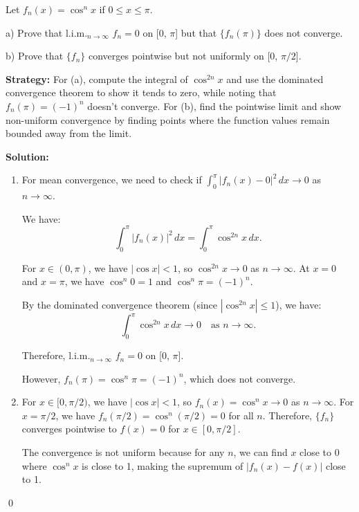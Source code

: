 \begin{problembox}
Let \( f_n(x) = \cos^n x \) if \( 0 \leq x \leq \pi \).

a) Prove that l.i.m.\(_{n\to\infty}\) \( f_n = 0 \) on [0, \(\pi\)] but that \( \{f_n(\pi)\} \) does not converge.

b) Prove that \( \{f_n\} \) converges pointwise but not uniformly on [0, \(\pi/2\)].
\end{problembox}

\noindent\textbf{Strategy:} For (a), compute the integral of \( \cos^{2n} x \) and use the dominated convergence theorem to show it tends to zero, while noting that \( f_n(\pi) = (-1)^n \) doesn't converge. For (b), find the pointwise limit and show non-uniform convergence by finding points where the function values remain bounded away from the limit.

\bigskip\noindent\textbf{Solution:}
\begin{enumerate}[label=(\alph*)]
\item For mean convergence, we need to check if \( \int_0^\pi |f_n(x) - 0|^2 \, dx \to 0 \) as \( n \to \infty \).

We have:
\[\int_0^\pi |f_n(x)|^2 \, dx = \int_0^\pi \cos^{2n} x \, dx.\]

For \( x \in (0, \pi) \), we have \( |\cos x| < 1 \), so \( \cos^{2n} x \to 0 \) as \( n \to \infty \). At \( x = 0 \) and \( x = \pi \), we have \( \cos^n 0 = 1 \) and \( \cos^n \pi = (-1)^n \).

By the dominated convergence theorem (since \( |\cos^{2n} x| \leq 1 \)), we have:
\[\int_0^\pi \cos^{2n} x \, dx \to 0 \quad \text{as } n \to \infty.\]

Therefore, l.i.m.\(_{n\to\infty}\) \( f_n = 0 \) on [0, \(\pi\)].

However, \( f_n(\pi) = \cos^n \pi = (-1)^n \), which does not converge.

\item For \( x \in [0, \pi/2) \), we have \( |\cos x| < 1 \), so \( f_n(x) = \cos^n x \to 0 \) as \( n \to \infty \). For \( x = \pi/2 \), we have \( f_n(\pi/2) = \cos^n(\pi/2) = 0 \) for all \( n \). Therefore, \( \{f_n\} \) converges pointwise to \( f(x) = 0 \) for \( x \in [0, \pi/2] \).

The convergence is not uniform because for any \( n \), we can find \( x \) close to 0 where \( \cos^n x \) is close to 1, making the supremum of \( |f_n(x) - f(x)| \) close to 1.
\end{enumerate}\qed


